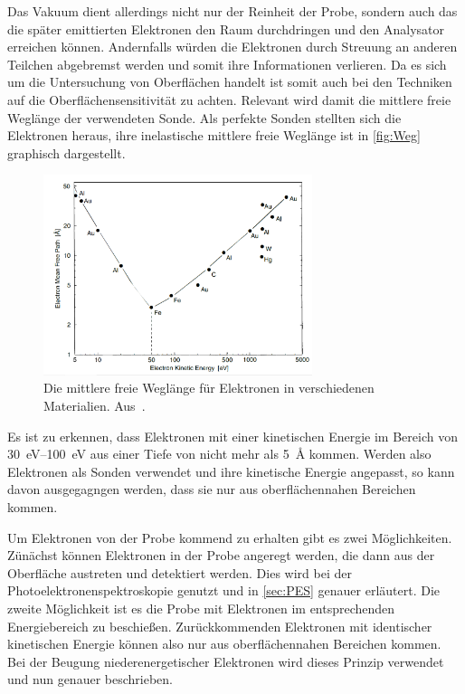         Das Vakuum dient allerdings nicht nur der Reinheit der Probe, sondern auch das die später emittierten Elektronen den Raum durchdringen und den Analysator erreichen können.
        Andernfalls würden die Elektronen durch Streuung an anderen Teilchen abgebremst werden und somit ihre Informationen verlieren.
        Da es sich um die Untersuchung von Oberflächen handelt ist somit auch bei den Techniken auf die Oberflächensensitivität zu achten.
        Relevant wird damit die mittlere freie Weglänge der verwendeten Sonde.
        Als perfekte Sonden stellten sich die Elektronen heraus, ihre inelastische mittlere freie Weglänge ist in \autoref{fig:Weg} graphisch dargestellt.
        \begin{figure}
            \centering
            \includegraphics[width=0.7\textwidth]{Weg}
            \caption{Die mittlere freie Weglänge für Elektronen in verschiedenen Materialien. Aus~\cite{Hüfner}.}
            \label{fig:Weg}
        \end{figure}
        Es ist zu erkennen, dass Elektronen mit einer kinetischen Energie im Bereich von \SIrange{30}{100}{\electronvolt} aus einer Tiefe von nicht mehr als \SI{5}{\angstrom} kommen.
        Werden also Elektronen als Sonden verwendet und ihre kinetische Energie angepasst, so kann davon ausgegagngen werden, dass sie nur aus oberflächennahen Bereichen kommen.

        Um Elektronen von der Probe kommend zu erhalten gibt es zwei Möglichkeiten.
        Zünächst können Elektronen in der Probe angeregt werden, die dann aus der Oberfläche austreten und detektiert werden.
        Dies wird bei der Photoelektronenspektroskopie genutzt und in \autoref{sec:PES} genauer erläutert.
        Die zweite Möglichkeit ist es die Probe mit Elektronen im entsprechenden Energiebereich zu beschießen.
        Zurückkommenden Elektronen mit identischer kinetischen Energie können also nur aus oberflächennahen Bereichen kommen.
        Bei der Beugung niederenergetischer Elektronen wird dieses Prinzip verwendet und nun genauer beschrieben.

